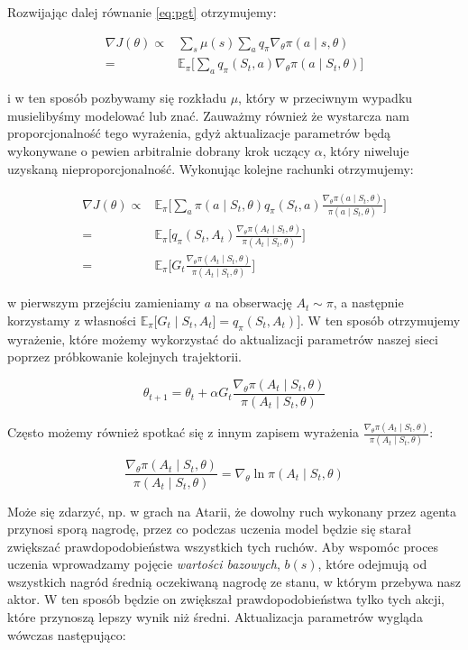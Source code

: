 \documentclass[licencjacka]{pracamgr}
\begin{document}
Rozwijając dalej równanie \eqref{eq:pgt} otrzymujemy:

\begin{align*}
\nabla J(\theta) \propto & \sum_s \mu(s) \sum_a q_{\pi} \nabla_{\theta} \pi(a \mid s, \theta) \\
= & \mathbb{E}_\pi \Bigg[ \sum_{a} q_\pi (S_t, a) \nabla_\theta \pi(a \mid S_t, \theta) \Bigg]
\end{align*}

i w ten sposób pozbywamy się rozkładu $\mu$, który w przeciwnym wypadku musielibyśmy modelować lub znać. Zauważmy również że wystarcza nam proporcjonalność tego wyrażenia, gdyż aktualizacje parametrów będą wykonywane o pewien arbitralnie dobrany krok uczący $\alpha$, który niweluje uzyskaną nieproporcjonalność. Wykonując kolejne rachunki otrzymujemy: 

\begin{align*}
\nabla J(\theta) \propto  & \mathbb{E}_\pi \Bigg[ \sum_{a} \pi(a \mid S_t, \theta) q_\pi (S_t, a) \frac{\nabla_\theta \pi(a \mid S_t, \theta)}{\pi(a \mid S_t, \theta)} \Bigg] \\
= & \mathbb{E}_\pi \Bigg[ q_\pi(S_t, A_t) \frac{\nabla_\theta \pi(A_t \mid S_t, \theta)}{\pi(A_t \mid S_t, \theta)} \Bigg] \\ 
= & \mathbb{E}_\pi \Bigg[ G_t \frac{\nabla_\theta \pi(A_t \mid S_t, \theta)}{\pi(A_t \mid S_t, \theta)} \Bigg] 
\end{align*}

w pierwszym przejściu zamieniamy $a$ na obserwację $A_t \sim \pi$, a następnie korzystamy z własności $ \mathbb{E}_\pi \big[ G_t \mid S_t, A_t \big] = q_\pi(S_t, A_t) \big] $. W ten sposób otrzymujemy wyrażenie, które możemy wykorzystać do aktualizacji parametrów naszej sieci poprzez próbkowanie kolejnych trajektorii.

$$ \theta_{t+1} = \theta_t + \alpha G_t \frac{\nabla_\theta \pi(A_t \mid S_t, \theta)}{\pi(A_t \mid S_t, \theta)} $$

Często możemy również spotkać się z innym zapisem wyrażenia $  \frac{\nabla_\theta \pi(A_t \mid S_t, \theta)}{\pi(A_t \mid S_t, \theta)}$:

$$  \frac{\nabla_\theta \pi(A_t \mid S_t, \theta)}{\pi(A_t \mid S_t, \theta)} = \nabla_\theta \ln \pi(A_t \mid S_t, \theta) $$

Może się zdarzyć, np. w grach na Atarii, że dowolny ruch wykonany przez agenta przynosi sporą nagrodę, przez co podczas uczenia model będzie się starał zwiększać prawdopodobieństwa wszystkich tych ruchów. Aby wspomóc proces uczenia wprowadzamy pojęcie \emph{wartości bazowych}, $b(s)$, które odejmują od wszystkich nagród średnią oczekiwaną nagrodę ze stanu, w którym przebywa nasz aktor. W ten sposób będzie on zwiększał prawdopodobieństwa tylko tych akcji, które przynoszą lepszy wynik niż średni. Aktualizacja parametrów wygląda wówczas następująco:
\end{document}
